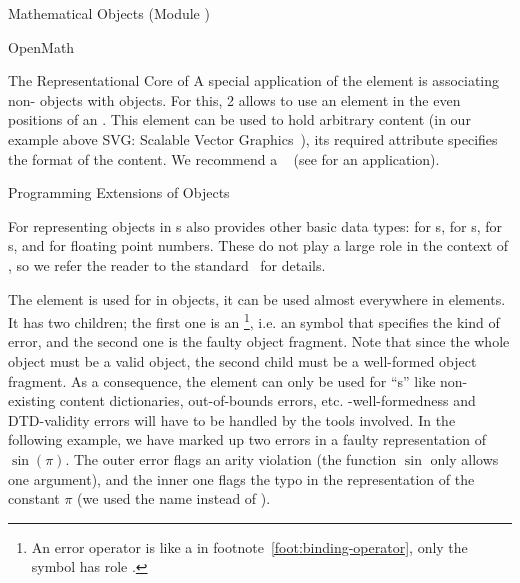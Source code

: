 \begin{tchapter}[id=mobj,short=Mathematical Objects]{Mathematical Objects (Module {})}
\begin{tsection}[id=openmath]{OpenMath}
\begin{tsubsection}[id=om:core]{The Representational Core of {\openmath}}
A special application of the {} element is associating
non-{} objects with {\openmath} objects. For this, {\openmath}2 allows to
use an {} element in the even positions of an
{}. This element can be used to hold arbitrary {\xml} content
(in our example above SVG: Scalable Vector Graphics~\cite{W3C:svg02}), its required
{} attribute specifies the format of the
content.  We recommend a {}~\cite{FreBor:MIME96} (see
{} for an application).
\end{tsubsection}
  
\begin{tsubsection}[id=om:error]{Programming Extensions of {\openmath} Objects}

  For representing objects in {s} {\openmath} also
  provides other basic data types: {} for {s},
  {} for {s}, {} for
  {s}, and {} for floating point numbers. These do
  not play a large role in the context of {\omdoc}, so we refer the reader to the
  {\openmath} standard~\cite{BusCapCar:2oms04} for details.


  The {} element is used for {} in
  {\openmath} objects, it can be used almost everywhere in {\openmath} elements. It has
  two children; the first one is an {}\footnote{An error operator
    is like a {} in footnote~\ref{foot:binding-operator}, only
    the symbol has role {}.}, i.e. an {\openmath} symbol that
  specifies the kind of error, and the second one is the faulty {\openmath} object
  fragment. Note that since the whole object must be a valid {\openmath} object, the
  second child must be a well-formed {\openmath} object fragment. As a consequence, the
  {} element can only be used for ``{s}''
  like non-existing content dictionaries, out-of-bounds errors, etc.
  {\xml}-well-formedness and DTD-validity errors will have to be handled by the {\xml}
  tools involved. In the following example, we have marked up two errors in a faulty
  representation of $\sin(\pi)$.  The outer error flags an arity violation (the function
  $\sin$ only allows one argument), and the inner one flags the typo in the representation
  of the constant $\pi$ (we used the name {} instead of {}).


\end{tsubsection}
\end{tsection}
\end{tchapter}
